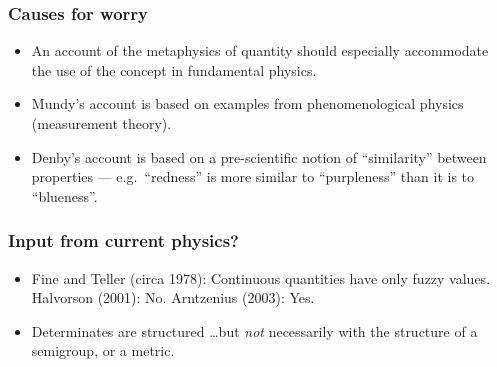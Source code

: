 \documentclass{beamer}
\begin{document}
\begin{frame}\frametitle{Causes for worry}
\pause

\begin{itemize}
\item An account of the metaphysics of quantity should especially
  accommodate the use of the concept in fundamental physics. \pause
\item Mundy's account is based on examples from phenomenological
  physics (measurement theory). \pause
\item Denby's account is based on a pre-scientific notion of
  ``similarity'' between properties --- e.g.\ ``redness'' is more
  similar to ``purpleness'' than it is to ``blueness''.
\end{itemize}
\end{frame}


\begin{frame}
\frametitle{Input from current physics?} \pause
\begin{itemize}
\item Fine and Teller (circa 1978): Continuous quantities have only
  fuzzy values.  \pause Halvorson (2001): No. \pause Arntzenius
  (2003): Yes. \pause
\end{itemize}
\begin{itemize}
\item Determinates are structured \dots but \emph{not} necessarily
  with the structure of a semigroup, or a metric.  \pause

\end{itemize}
\end{frame}
\end{document}
